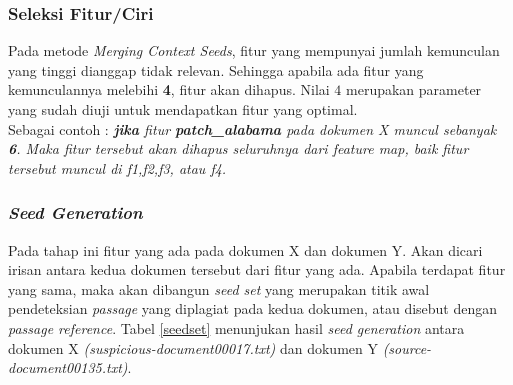 \documentclass[../Book.tex]{subfiles}
\begin{document}
	\begin{table}[H]
		\centering
	\end{table}
	
	\subsubsection{Seleksi Fitur/Ciri}
	Pada metode \textit{Merging Context Seeds}, fitur yang mempunyai jumlah kemunculan yang tinggi dianggap tidak relevan. Sehingga apabila ada fitur yang kemunculannya melebihi \textbf{4}, fitur akan dihapus. Nilai $4$ merupakan parameter yang sudah diuji\cite{mcs} untuk mendapatkan fitur yang optimal.\\ 
	
	\noindent Sebagai contoh : \textit{\textbf{jika} fitur \textbf{patch\_alabama} pada dokumen X muncul sebanyak \textbf{6}. Maka fitur tersebut akan dihapus seluruhnya dari feature map, baik fitur tersebut muncul di f1,f2,f3, atau f4.}
	
	
	\subsubsection{\textit{Seed Generation}}
	Pada tahap ini fitur yang ada pada dokumen X dan dokumen Y. Akan dicari irisan antara kedua dokumen tersebut dari fitur yang ada. Apabila terdapat fitur yang sama, maka akan dibangun \textit{seed set} yang merupakan titik awal pendeteksian \textit{passage} yang diplagiat pada kedua dokumen, atau disebut dengan \textit{passage reference}. Tabel \ref{seedset} menunjukan hasil \textit{seed generation} antara dokumen X \textit{(suspicious-document00017.txt)} dan dokumen Y \textit{(source-document00135.txt)}.
	
\end{document}
